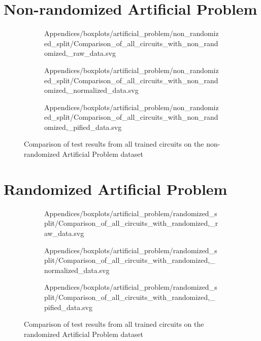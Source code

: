 \clearpage 
\section{Non-randomized Artificial Problem}
\label{chapter:artificial_problem_non_randomized}

\begin{figure}[!h]
    \begin{subfigure}{.5\textwidth}
        \centering
        
        {Appendices/boxplots/artificial_problem/non_randomized_split/Comparison_of_all_circuits_with_non_randomized,_raw_data.svg}
    \end{subfigure}
    \begin{subfigure}{.5\textwidth}
        \centering
        
        {Appendices/boxplots/artificial_problem/non_randomized_split/Comparison_of_all_circuits_with_non_randomized,_normalized_data.svg}
    \end{subfigure}
    \begin{subfigure}{.5\textwidth}
        \centering
        
        {Appendices/boxplots/artificial_problem/non_randomized_split/Comparison_of_all_circuits_with_non_randomized,_pified_data.svg}
    \end{subfigure}
    \caption{Comparison of test results from all trained circuits on the non-randomized Artificial Problem dataset}
    \label{fig:circuits_results_non_r_ap}
\end{figure}

\clearpage 
\section{Randomized Artificial Problem}
\label{chapter:artificial_problem_randomized}
\begin{figure}[!h]
    \begin{subfigure}{.5\textwidth}
        \centering
        
        {Appendices/boxplots/artificial_problem/randomized_split/Comparison_of_all_circuits_with_randomized,_raw_data.svg}
    \end{subfigure}
    \begin{subfigure}{.5\textwidth}
        \centering
        
        {Appendices/boxplots/artificial_problem/randomized_split/Comparison_of_all_circuits_with_randomized,_normalized_data.svg}
    \end{subfigure}
    \begin{subfigure}{.5\textwidth}
        \centering
        
        {Appendices/boxplots/artificial_problem/randomized_split/Comparison_of_all_circuits_with_randomized,_pified_data.svg}
    \end{subfigure}
    \caption{Comparison of test results from all trained circuits on the randomized Artificial Problem dataset}
    \label{fig:circuits_results_r_ap}
\end{figure}

